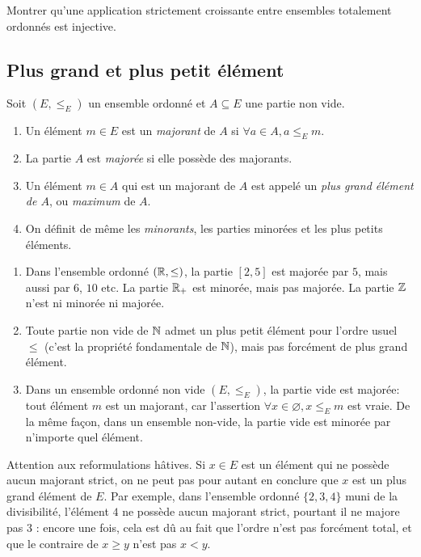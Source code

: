 \begin{exercice}
Montrer qu'une application strictement croissante entre ensembles totalement ordonnés est injective.
\end{exercice}




\subsection{Plus grand et plus petit élément}
\begin{definition}
Soit $(E,\leq_E)$ un ensemble ordonné et $A\subseteq E$ une partie non vide.
\begin{enumerate}
\item Un élément $m\in E$ est un \emph{majorant} de $A$ si $\forall a\in A, a\leq_E m$.
\item La partie $A$ est \emph{majorée} si elle possède des majorants.
\item Un élément $m\in A$ qui est un majorant de $A$ est appelé un \emph{plus grand élément de $A$}, ou \emph{maximum} de $A$.
\item On définit de même les \emph{minorants}, les parties minorées et les plus petits éléments.
\end{enumerate}
\end{definition}

\begin{exemple}
\begin{enumerate}[label=\alph*)]
\item Dans l'ensemble ordonné $(\mathbb{R},\leq)$, la partie $[2,5]$ est majorée par $5$, mais aussi par $6$, $10$ etc. La partie $\mathbb{R}_+$ est minorée, mais pas majorée. La partie $\mathbb{Z}$ n'est ni minorée ni majorée.
\item Toute partie non vide de $\mathbb{N}$ admet un plus petit élément pour l'ordre usuel $\leq$ (c'est la propriété fondamentale de $\mathbb{N}$), mais pas forcément de plus grand élément.
\item Dans un ensemble ordonné non vide $(E,\leq_E)$, la partie vide est majorée: tout élément $m$ est un majorant, car l'assertion $\forall x\in \varnothing, x\leq_E m$ est vraie. De la même façon, dans un ensemble non-vide, la partie vide est minorée par n'importe quel élément.
\end{enumerate}
\end{exemple}

\begin{remarque}
Attention aux reformulations hâtives. Si $x\in E$ est un élément qui ne possède aucun majorant strict, on ne peut pas pour autant en conclure que $x$ est un plus grand élément de $E$. Par exemple, dans l'ensemble ordonné $\{2,3,4\}$ muni de la divisibilité, l'élément $4$ ne possède aucun majorant strict, pourtant il ne majore pas $3$ : encore une fois, cela est dû au fait que l'ordre n'est pas forcément total, et que le contraire de $x\geq y$ n'est pas $x<y$.
\end{remarque}



